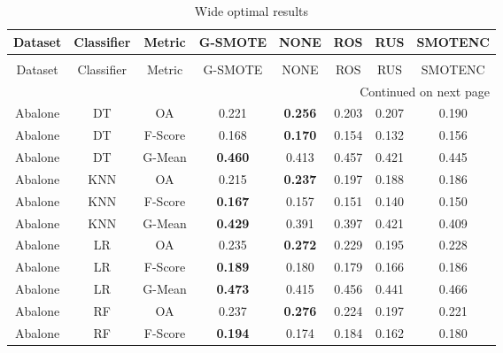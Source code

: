 \begin{longtable}{cccccccc}
\caption{Wide optimal results}
\label{tbl:wide_optimal}\\
\toprule
        Dataset & Classifier &  Metric &        G-SMOTE &           NONE &            ROS &            RUS &        SMOTENC \\
\midrule
\endfirsthead
\caption[]{Wide optimal results} \\
\toprule
        Dataset & Classifier &  Metric &        G-SMOTE &           NONE &            ROS &            RUS &        SMOTENC \\
\midrule
\endhead
\midrule
\multicolumn{8}{r}{{Continued on next page}} \\
\midrule
\endfoot

\bottomrule
\endlastfoot
        Abalone &         DT &      OA &          0.221 & \textbf{0.256} &          0.203 &          0.207 &          0.190 \\
        Abalone &         DT & F-Score &          0.168 & \textbf{0.170} &          0.154 &          0.132 &          0.156 \\
        Abalone &         DT &  G-Mean & \textbf{0.460} &          0.413 &          0.457 &          0.421 &          0.445 \\
        Abalone &        KNN &      OA &          0.215 & \textbf{0.237} &          0.197 &          0.188 &          0.186 \\
        Abalone &        KNN & F-Score & \textbf{0.167} &          0.157 &          0.151 &          0.140 &          0.150 \\
        Abalone &        KNN &  G-Mean & \textbf{0.429} &          0.391 &          0.397 &          0.421 &          0.409 \\
        Abalone &         LR &      OA &          0.235 & \textbf{0.272} &          0.229 &          0.195 &          0.228 \\
        Abalone &         LR & F-Score & \textbf{0.189} &          0.180 &          0.179 &          0.166 &          0.186 \\
        Abalone &         LR &  G-Mean & \textbf{0.473} &          0.415 &          0.456 &          0.441 &          0.466 \\
        Abalone &         RF &      OA &          0.237 & \textbf{0.276} &          0.224 &          0.197 &          0.221 \\
        Abalone &         RF & F-Score & \textbf{0.194} &          0.174 &          0.184 &          0.162 &          0.180 \\

\end{longtable}
